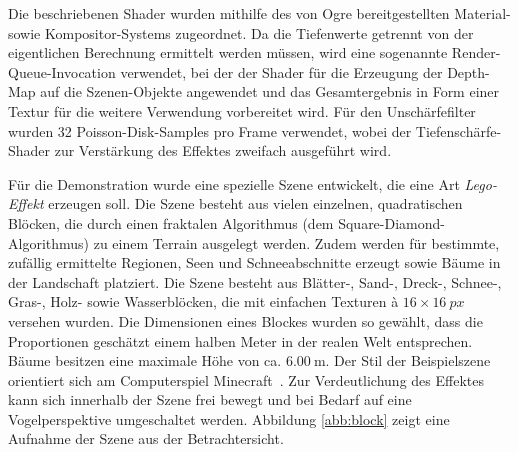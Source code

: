 \documentclass{acmsiggraph}                     %
\begin{document}
Die beschriebenen Shader wurden mithilfe des von Ogre bereitgestellten Material- sowie Kompositor-Systems zugeordnet. Da die Tiefenwerte getrennt von der eigentlichen Berechnung ermittelt werden müssen, wird eine sogenannte Render-Queue-Invocation verwendet, bei der der Shader für die Erzeugung der Depth-Map auf die Szenen-Objekte angewendet und das Gesamtergebnis in Form einer Textur für die weitere Verwendung vorbereitet wird. Für den Unschärfefilter wurden 32 Poisson-Disk-Samples pro Frame verwendet, wobei der Tiefenschärfe-Shader zur Verstärkung des Effektes zweifach ausgeführt wird.

Für die Demonstration wurde eine spezielle Szene entwickelt, die eine Art \emph{Lego-Effekt} erzeugen soll. Die Szene besteht aus vielen einzelnen, quadratischen Blöcken, die durch einen fraktalen Algorithmus (dem Square-Diamond-Algorithmus) zu einem Terrain ausgelegt werden. Zudem werden für bestimmte, zufällig ermittelte Regionen, Seen und Schneeabschnitte erzeugt sowie Bäume in der Landschaft platziert. Die Szene besteht aus Blätter-, Sand-, Dreck-, Schnee-, Gras-, Holz- sowie Wasserblöcken, die mit einfachen Texturen à $16\times\SI{16}{px}$ versehen wurden. Die Dimensionen eines Blockes wurden so gewählt, dass die Proportionen geschätzt einem halben Meter in der realen Welt entsprechen. Bäume besitzen eine maximale Höhe von ca. $\SI{6.00}{\meter}$. Der Stil der Beispielszene orientiert sich am Computerspiel Minecraft~\cite{Mojang:2011zr}. Zur Verdeutlichung des Effektes kann sich innerhalb der Szene frei bewegt und bei Bedarf auf eine Vogelperspektive umgeschaltet werden. Abbildung \ref{abb:block} zeigt eine Aufnahme der Szene aus der Betrachtersicht. %
\end{document}
